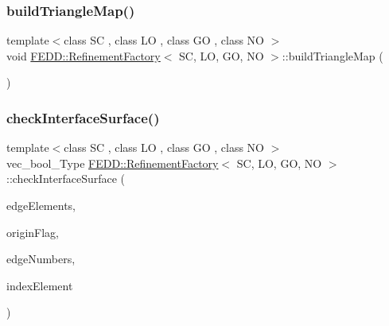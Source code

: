 \mbox{\label{classFEDD_1_1RefinementFactory_a39c950be5d386f7a75f6d7392a9a2bc8}} 
\subsubsection{\texorpdfstring{build\+Triangle\+Map()}{buildTriangleMap()}}
{\footnotesize\ttfamily template$<$class SC , class LO , class GO , class NO $>$ \\
void \hyperlink{classFEDD_1_1RefinementFactory}{F\+E\+D\+D\+::\+Refinement\+Factory}$<$ SC, LO, GO, NO $>$\+::build\+Triangle\+Map (\begin{DoxyParamCaption}{ }\end{DoxyParamCaption})}

\mbox{\label{classFEDD_1_1RefinementFactory_a97003a4445b40ac91728639de432a449}} 
\subsubsection{\texorpdfstring{check\+Interface\+Surface()}{checkInterfaceSurface()}}
{\footnotesize\ttfamily template$<$class SC , class LO , class GO , class NO $>$ \\
vec\+\_\+bool\+\_\+\+Type \hyperlink{classFEDD_1_1RefinementFactory}{F\+E\+D\+D\+::\+Refinement\+Factory}$<$ SC, LO, GO, NO $>$\+::check\+Interface\+Surface (\begin{DoxyParamCaption}\item[{\hyperlink{classFEDD_1_1RefinementFactory_ae5285e990ec4632d6188a1280627ad13}{Edge\+Elements\+Ptr\+\_\+\+Type}}]{edge\+Elements,  }\item[{vec\+\_\+int\+\_\+\+Type}]{origin\+Flag,  }\item[{vec\+\_\+int\+\_\+\+Type}]{edge\+Numbers,  }\item[{int}]{index\+Element }\end{DoxyParamCaption})}

